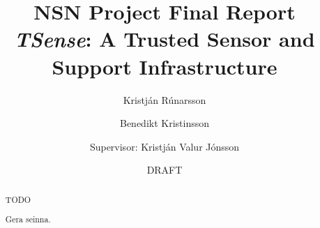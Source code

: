 \documentclass[10pt,titlepage,twoside,a4paper]{report}
\author{Kristj\'{a}n R\'{u}narsson \and Benedikt Kristinsson\\\and Supervisor: Kristj\'{a}n Valur J\'{o}nsson}
\title{NSN Project Final Report\\\textit{TSense}: A Trusted Sensor and Support Infrastructure}
\date{DRAFT}
\begin{document}
\maketitle
\begin{titlepage}
\end{titlepage}
\newpage
\ \ \ \\
\newpage

\setcounter{page}{1}

\tableofcontents

\begin{abstract}
TODO
\end{abstract}

\renewcommand{\abstractname}{{\'{U}}tdr\'{a}ttur}
\begin{abstract}
Gera seinna.
\end{abstract}

\setcounter{page}{1}
\pagestyle{headings}








\end{document}
